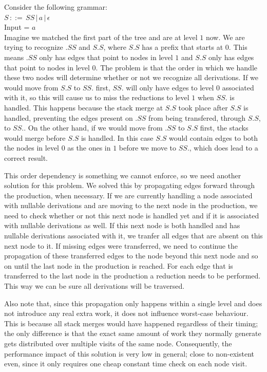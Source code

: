 \documentclass[a4paper,10pt]{article}
\begin{document}
Consider the following grammar:\\
$S\,::=\,SS\,|\,a\,|\,\epsilon$\\
Input = $a$\\
Imagine we matched the first part of the tree and are at level $1$ now. We are trying to recognize $.SS$ and $S.S$, where $S.S$ has a prefix that starts at $0$. This means $.SS$ only has edges that point to nodes in level $1$ and $S.S$ only has edges that point to nodes in level $0$. The problem is that the order in which we handle these two nodes will determine whether or not we recognize all derivations. If we would move from $S.S$ to $SS.$ first, $SS.$ will only have edges to level $0$ associated with it, so this will cause us to miss the reductions to level $1$ when $SS.$ is handled. This happens because the stack merge at $S.S$ took place after $S.S$ is handled, preventing the edges present on $.SS$ from being transfered, through $S.S$, to $SS.$. On the other hand, if we would move from $.SS$ to $S.S$ first, the stacks would merge before $S.S$ is handled. In this case $S.S$ would contain edges to both the nodes in level $0$ as the ones in $1$ before we move to $SS.$, which does lead to a correct result.

This order dependency is something we cannot enforce, so we need another solution for this problem. We solved this by propagating edges forward through the production, when necessary. If we are currently handling a node associated with nullable derivations and are moving to the next node in the production, we need to check whether or not this next node is handled yet and if it is associated with nullable derivations as well. If this next node is both handled and has nullable derivations associated with it, we tranfer all edges that are absent on this next node to it. If missing edges were transferred, we need to continue the propagation of these transferred edges to the node beyond this next node and so on until the last node in the production is reached. For each edge that is transferred to the last node in the production a reduction needs to be performed. This way we can be sure all derivations will be traversed.

Also note that, since this propagation only happens within a single level and does not introduce any real extra work, it does not influence worst-case behaviour. This is because all stack merges would have happened regardless of their timing; the only difference is that the exact same amount of work they normally generate gets distributed over multiple visits of the same node. Consequently, the performance impact of this solution is very low in general; close to non-existent even, since it only requires one cheap constant time check on each node visit.
\end{document}
